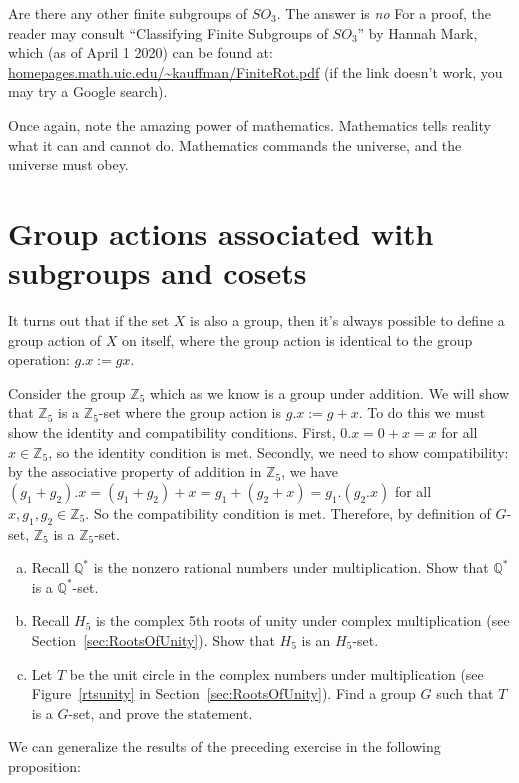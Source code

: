 Are there any other finite subgroups of $SO_3$.  The answer is \emph{no} For a proof, the reader may consult ``Classifying Finite Subgroups of $SO_3$'' by Hannah Mark, which (as of April 1 2020) can be found at: \url{homepages.math.uic.edu/~kauffman/FiniteRot.pdf}  (if the link doesn't work, you may try a Google search).

Once again, note the amazing power of mathematics. Mathematics tells reality what it can and cannot do. Mathematics commands the universe, and the universe must obey. 


\section{Group actions associated with subgroups and cosets}
\label{sec:SubgroupsAndCosets}

It turns out that if the set $X$ is also a group, then it's always possible to define a group action of $X$ on itself, where the group action is identical to the group operation: $g.x:=gx$.

\begin{example}\label{example:actions:SubgroupAction1}
Consider the group $\mathbb{Z}_5$ which as we know is a group under addition. We will show that $\mathbb{Z}_5$ is a $\mathbb{Z}_5$-set where the group action is $g.x := g+x$. To do this we must show the identity and compatibility conditions. First, $0.x = 0+x = x$ for all $x \in\mathbb {Z}_5$, so the identity condition is met.  Secondly, we need to show compatibility: by the associative property of addition in $\mathbb {Z}_5$, we have $(g_1+g_2).x = (g_1+g_2)+x  = g_1+(g_2+x) = g_1.(g_2.x)$ for all $x, g_1,g_2 \in\mathbb{ Z}_5$. So the compatibility condition is met.  Therefore, by definition of $G$-set, $\mathbb{Z}_5$ is a $\mathbb{Z}_5$-set.
\end{example}

\begin{exercise}\label{exercise:actions:SubgroupAction2}
\begin{enumerate} [(a)]
\item Recall $\mathbb{ Q}^* $ is the nonzero rational numbers under multiplication. Show that $\mathbb{ Q}^* $ is a $\mathbb{ Q}^* $-set.
\item Recall $H_5$ is the complex 5th roots of unity under complex multiplication (see Section~\ref{sec:RootsOfUnity}). Show that $H_5$ is an $H_5$-set.
\item Let $T$ be the unit circle in the complex numbers under multiplication (see Figure~\ref{rtsunity} in Section~\ref{sec:RootsOfUnity}).  Find a group $G$ such that $T$ is a $G$-set, and prove the statement.
\end{enumerate}
\end{exercise}
We can generalize the results of the preceding exercise in the following proposition:


